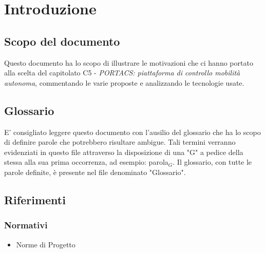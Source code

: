 \section{Introduzione}
\subsection{Scopo del documento}
Questo documento ha lo scopo di illustrare le motivazioni che ci hanno portato alla scelta del capitolato C5 - \textit{PORTACS: piattaforma di controllo mobilità autonoma}, commentando le varie proposte e analizzando le tecnologie usate.

\subsection{Glossario}
E' consigliato leggere questo documento con l'ausilio del glossario che ha lo scopo di definire parole che potrebbero risultare ambigue. Tali termini verranno evidenziati in questo file attraverso la disposizione di una "G" a pedice della stessa alla sua prima occorrenza, ad esempio: parola$_G$.
Il glossario, con tutte le parole definite, è presente nel file denominato "Glossario".

\subsection{Riferimenti}
\subsubsection{Normativi}
\begin{itemize}
  \item Norme di Progetto

\end{itemize}
